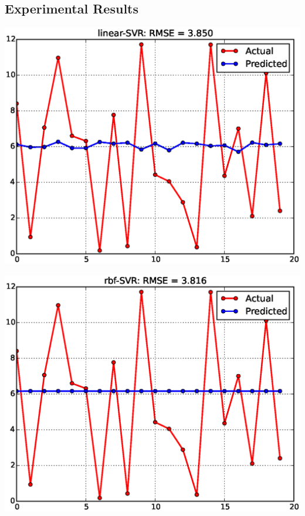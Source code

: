 \documentclass[a0,portrait]{a0poster}
\begin{document}
\begin{multicols}{3}
\section*{Experimental Results}
\begin{center}
\includegraphics[width=\linewidth]{linear-SVR.eps}
\end{center}
\begin{center}
\includegraphics[width=\linewidth]{rbf-SVR.eps}
\end{center}

\end{multicols}
\end{document}
